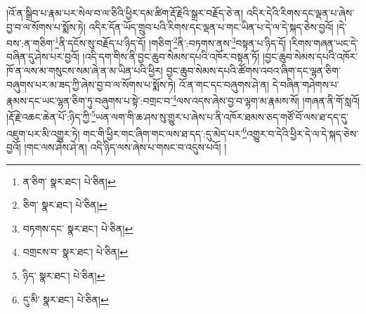 །འོ་ན་སྒྲིབ་པ་རྣམ་པར་སེལ་བ་ལ་ཅིའི་ཕྱིར་དམ་ཚིག་རྡོ་རྗེའི་སྒྲར་བརྗོད་ཅེ་ན། འདིར་དེའི་རིགས་དང་ལྡན་པ་ཞེས་བྱ་བ་ལ་སོགས་པ་སྨོས་ཏེ། འདིར་དོན་ཡོད་གྲུབ་པའི་རིགས་དང་ལྡན་པ་གང་ཡིན་པ་དེ་ལ་དེ་སྐད་ཅེས་བྱའོ། །དེ་བས་:ན་གཅིག་\footnote{ན་ཅིག་  སྣར་ཐང་།  པེ་ཅིན། }ནི་དངོས་སུ་བརྗོད་པ་ཉིད་དོ། །གཅིག་\footnote{ཅིག་  སྣར་ཐང་།  པེ་ཅིན། }ནི་:བཏགས་ནས་\footnote{བཏགས་དང་  སྣར་ཐང་།  པེ་ཅིན། }བསྟན་པ་ཉིད་དོ། །རིགས་གཞན་ཡང་དེ་བཞིན་དུ་ཤེས་པར་བྱའོ། །འདི་དག་གིས་ནི་བྱང་ཆུབ་སེམས་དཔའི་འཁོར་བསྟན་ཏོ། །བྱང་ཆུབ་སེམས་དཔའི་འཁོར་ཁོ་ན་ལས་མ་གསུངས་སམ་ཞེ་ན་མ་ཡིན་པའི་ཕྱིར། བྱང་ཆུབ་སེམས་དཔའི་ཚོགས་འབའ་ཞིག་དང་ལྷན་ཅིག་བཞུགས་པར་མ་ཟད་ཀྱི་ཞེས་བྱ་བ་ལ་སོགས་པ་སྨོས་ཏེ། འོ་ན་གང་དང་བཞུགས་ཤེ་ན། དེ་བཞིན་གཤེགས་པ་རྣམས་དང་ཡང་ལྷན་ཅིག་ཏུ་བཞུགས་པ་སྟེ་:བགྲང་བ་\footnote{བགྲངས་བ་  སྣར་ཐང་།  པེ་ཅིན། }ལས་འདས་ཞེས་བྱ་བ་ལྷག་མ་རྣམས་སོ། །གཞན་ནི་གོ་སླའོ། །རྡོ་རྗེ་འཆང་ཆེན་པོ་:ཉིད་ཀྱི་\footnote{ཉིད་  སྣར་ཐང་།  པེ་ཅིན། }ཡན་ལག་གི་ཆ་ཤས་སུ་གྱུར་པ་ཞེས་པ་ནི་འཁོར་ཐམས་ཅད་གཙོ་བོ་ལས་ཐ་དད་དུ་འཇུག་པར་མི་འགྱུར་ཏེ། གང་གི་ཕྱིར་གང་ཞིག་གང་ལས་ཐ་དད་:དུ་མེད་པར་\footnote{དུ་མི་  སྣར་ཐང་།  པེ་ཅིན། }འགྱུར་བ་དེའི་ཕྱིར་དེ་ལ་དེ་སྐད་ཅེས་བྱའོ། །གང་ལས་ཤེས་ཤེ་ན། འདི་ཉིད་ལས་ཞེས་པ་གསང་བ་འདུས་པའོ། །
